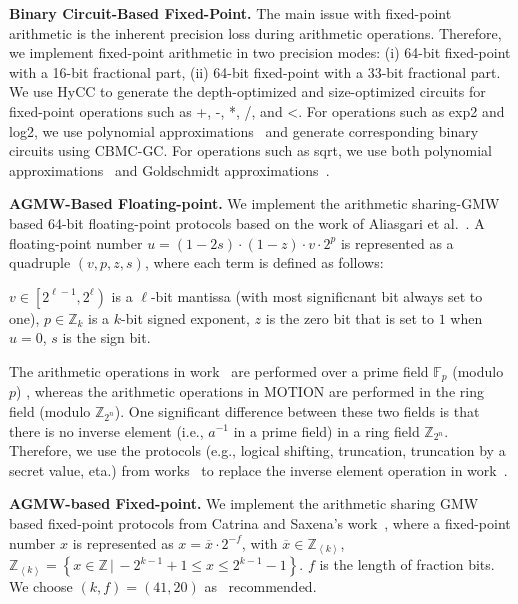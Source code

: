 \textbf{Binary Circuit-Based Fixed-Point.}
The main issue with fixed-point arithmetic is the inherent precision loss during arithmetic operations. Therefore, we implement fixed-point arithmetic in two precision modes:
(i) 64-bit fixed-point with a 16-bit fractional part,
(ii) 64-bit fixed-point with a 33-bit fractional part.
We use HyCC to generate the depth-optimized and size-optimized circuits for fixed-point operations such as +, -, *, /, and <.
For operations such as exp2 and log2, we use polynomial approximations~\cite{hart1978computer,aly2019benchmarking} and generate corresponding binary circuits using CBMC-GC.
For operations such as sqrt, we use both polynomial approximations~\cite{hart1978computer,aly2019benchmarking} and Goldschmidt approximations~\cite{markstein2004software,aly2019benchmarking}.

\textbf{AGMW-Based Floating-point.}
We implement the arithmetic sharing-GMW based 64-bit floating-point protocols based on the work of Aliasgari et al.~\cite{aliasgari2012secure}.
A floating-point number $u= \left(1-2s\right) \cdot \left(1-z\right) \cdot v \cdot 2^p$ is represented as a quadruple $\left(v, p, z, s\right) $, where each term is defined as follows:

$v\in \left[2^{\ell-1},2^{\ell}\right) $ is a $\ell$-bit mantissa (with most significnant bit always set to one),
$p\in \mathbb{Z} _k$ is a $k$-bit signed exponent,
$z$ is the zero bit that is set to $1$ when $u=0$,
$s$ is the sign bit.

The arithmetic operations in work~\cite{aliasgari2012secure} are performed over a prime field $\mathbb{F}_p$ (modulo $p$) , whereas the arithmetic operations in MOTION are performed in the ring field (modulo $\mathbb{Z} _{2^{n}}$). One significant difference between these two fields is that there is no inverse element (i.e., $a^{-1}$ in a prime field) in a ring field $\mathbb{Z} _{2^{n}}$. Therefore, we use the protocols (e.g., logical shifting, truncation, truncation by a secret value, eta.) from works~\cite{escudero2020improved,dalskov2020secure} to replace the inverse element operation in work~\cite{aliasgari2012secure}.

\textbf{AGMW-based Fixed-point.}
We implement the arithmetic sharing GMW based fixed-point protocols from Catrina and Saxena's work~\cite{catrina2010secure}, where a fixed-point number $x$ is represented as $x = \overline{x}\cdot  2^{-f}$, with $\overline{x}\in \mathbb{Z} _{\left\langle k\right\rangle }$, $ \mathbb{Z} _{\left\langle k\right\rangle }=\left\{x\in \mathbb{Z}  \,|\,-2^{k-1}+1\leq x \leq 2^{k-1}-1\right\} $. $f$ is the length of fraction bits. We choose $\left(k,f\right)=\left(41,20\right)  $ as~\cite{aly2021scale} recommended.



